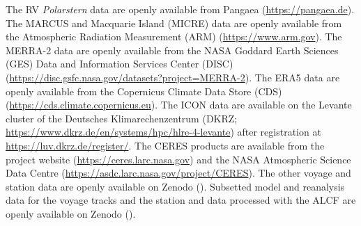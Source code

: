 \documentclass[12pt,a4paper]{article}
\begin{document}
The RV \emph{Polarstern} data are openly available from Pangaea
(\url{https://pangaea.de}). The MARCUS and Macquarie Island (MICRE) data are
openly available from the Atmospheric Radiation Measurement (ARM)
(\url{https://www.arm.gov}). The MERRA-2 data are openly available from the
NASA Goddard Earth Sciences (GES) Data and Information Services Center
(DISC) (\url{https://disc.gsfc.nasa.gov/datasets?project=MERRA-2}).  The ERA5
data are openly available from the Copernicus Climate Data Store (CDS)
(\url{https://cds.climate.copernicus.eu}). The ICON data are available on the
Levante cluster of the Deutsches Klimarechenzentrum (DKRZ;
\url{https://www.dkrz.de/en/systems/hpc/hlre-4-levante}) after registration at
\url{https://luv.dkrz.de/register/}. The CERES products are available from the
project website (\url{https://ceres.larc.nasa.gov}) and the NASA Atmospheric
Science Data Centre (\url{https://asdc.larc.nasa.gov/project/CERES}). The other
voyage and station data are openly available on Zenodo (). Subsetted model and
reanalysis data for the voyage tracks and the station and data processed with
the ALCF are openly available on Zenodo ().

\fontsize{11pt}{13pt}\selectfont
\setlength{\bibsep}{0.0pt}

\end{document}
